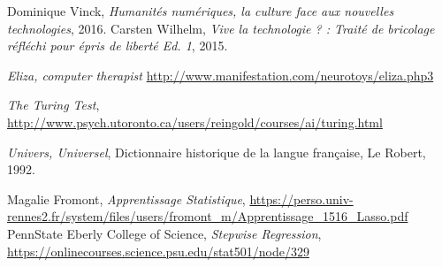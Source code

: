 \begin{thebibliography}{99}
     Dominique Vinck, \emph{Humanités numériques, la culture face aux nouvelles technologies}, 2016.
     Carsten Wilhelm, \emph{Vive la technologie ? : Traité de bricolage réfléchi pour épris de liberté Ed. 1}, 2015.

     \emph{Eliza, computer therapist} \url{http://www.manifestation.com/neurotoys/eliza.php3}

     \emph{The Turing Test}, \url{http://www.psych.utoronto.ca/users/reingold/courses/ai/turing.html}

     \emph{Univers, Universel}, Dictionnaire historique de la langue française, Le Robert, 1992.

     Magalie Fromont, \emph{Apprentissage Statistique}, \url{https://perso.univ-rennes2.fr/system/files/users/fromont_m/Apprentissage_1516_Lasso.pdf}
     PennState Eberly College of Science, \emph{Stepwise Regression}, \url{https://onlinecourses.science.psu.edu/stat501/node/329}
\end{thebibliography}
